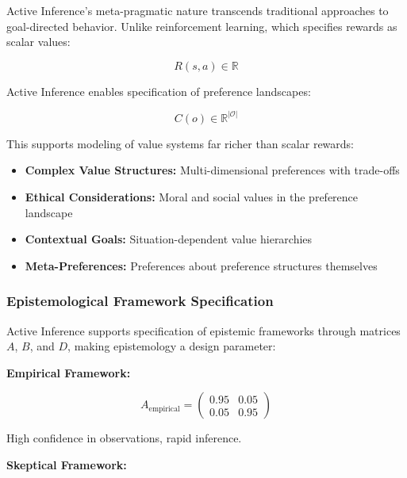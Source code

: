\documentclass[
]{article}
\providecommand{\tightlist}{%
  \setlength{\itemsep}{0pt}\setlength{\parskip}{0pt}}
\begin{document}
Active Inference's meta-pragmatic nature transcends traditional
approaches to goal-directed behavior. Unlike reinforcement learning,
which specifies rewards as scalar values:

\begin{equation}
R(s,a) \in \mathbb{R}
\label{eq:traditional_reward}
\end{equation}

Active Inference enables specification of preference landscapes:

\begin{equation}
C(o) \in \mathbb{R}^{|\mathcal{O}|}
\label{eq:active_inference_preferences}
\end{equation}

This supports modeling of value systems far richer than scalar rewards:

\begin{itemize}
\tightlist
\item
  \textbf{Complex Value Structures:} Multi-dimensional preferences with
  trade-offs
\item
  \textbf{Ethical Considerations:} Moral and social values in the
  preference landscape
\item
  \textbf{Contextual Goals:} Situation-dependent value hierarchies
\item
  \textbf{Meta-Preferences:} Preferences about preference structures
  themselves
\end{itemize}

\subsubsection{Epistemological Framework
Specification}\label{epistemological-framework-specification}

Active Inference supports specification of epistemic frameworks through
matrices \(A\), \(B\), and \(D\), making epistemology a design
parameter:

\textbf{Empirical Framework:}

\begin{equation}
A_{\text{empirical}} = \begin{pmatrix} 0.95 & 0.05 \\ 0.05 & 0.95 \end{pmatrix}
\label{eq:empirical_framework}
\end{equation}

High confidence in observations, rapid inference.

\textbf{Skeptical Framework:}
\end{document}
